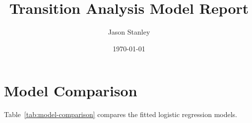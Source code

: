 \documentclass[11pt]{article}
\title{Transition Analysis Model Report}
\author{Jason Stanley}
\date{\today}
\begin{document}
\maketitle

\section{Model Comparison}

Table~\ref{tab:model-comparison} compares the fitted logistic regression models.


\end{document}
